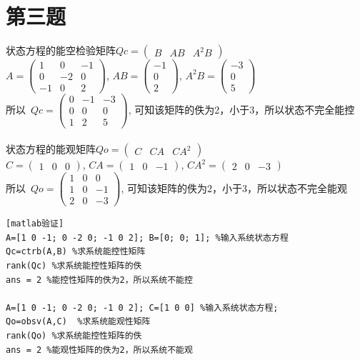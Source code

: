 \documentclass{article}
\begin{document}
\section*{第三题}
状态方程的能空检验矩阵$Qc=\left(\begin{array}{ccc} B & AB & A^{2}B \end{array}\right)$ \\
$A= \left(\begin{array}{ccc} 1 & 0 & -1\\ 0 & -2 & 0\\ -1 & 0 & 2 \end{array}\right) $,
$AB=  \left(\begin{array}{c} -1\\ 0\\ 2 \end{array}\right) $,
$A^{2}B=  \left(\begin{array}{c} -3\\ 0\\ 5 \end{array}\right) $ \\
\mbox{所以 }$Qc= \left(\begin{array}{ccc} 0 & -1 & -3\\ 0 & 0 & 0\\ 1 & 2 & 5 \end{array}\right) $, 可知该矩阵的佚为2，小于3，所以状态不完全能控\\
\noindent\\
状态方程的能观矩阵$Qo=\left(\begin{array}{ccc} C & CA & CA^{2} \end{array}\right) $
\\ $C= \left(\begin{array}{ccc} 1 & 0 & 0 \end{array}\right)$, 
$CA=\left(\begin{array}{ccc} 1 & 0 & -1 \end{array}\right)$,
$CA^{2}=\left(\begin{array}{ccc} 2 & 0 & -3 \end{array}\right)$ \\
\mbox{所以 }$Qo=\left(\begin{array}{ccc} 1 & 0 & 0\\ 1 & 0 & -1\\ 2 & 0 & -3 \end{array}\right)$, 可知该矩阵的佚为2，小于3，所以状态不完全能观

\begin{verbatim}[matlab验证]
A=[1 0 -1; 0 -2 0; -1 0 2]; B=[0; 0; 1]; %输入系统状态方程
Qc=ctrb(A,B) %求系统能控性矩阵
rank(Qc) %求系统能控性矩阵的佚
ans = 2 %能控性矩阵的佚为2，所以系统不能控
 
A=[1 0 -1; 0 -2 0; -1 0 2]; C=[1 0 0] %输入系统状态方程;   
Qo=obsv(A,C)  %求系统能观性矩阵
rank(Qo) %求系统能控性矩阵的佚
ans = 2 %能观性矩阵的佚为2，所以系统不能观
\end{verbatim}
\end{document}
